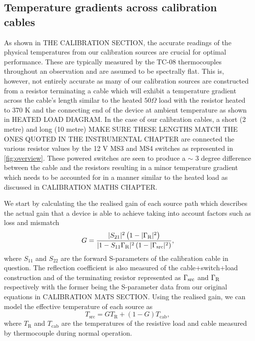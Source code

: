 \subsection{Temperature gradients across calibration cables}\label{sec:cable_gradient}
As shown in THE CALIBRATION SECTION, the accurate readings of the physical temperatures from our calibration sources are crucial for optimal performance. These are typically measured by the TC-08 thermocouples throughout an observation and are assumed to be spectrally flat. This is, however, not entirely accurate as many of our calibration sources are constructed from a resistor terminating a cable which will exhibit a temperature gradient across the cable’s length similar to the heated $50 \Omega$ load with the resistor heated to 370 K and the connecting end of the device at ambient temperature as shown in HEATED LOAD DIAGRAM. In the case of our calibration cables, a short (2 metre) and long (10 metre) MAKE SURE THESE LENGTHS MATCH THE ONES QUOTED IN THE INSTRUMENTAL CHAPTER are connected the various resistor values by the 12 V MS3 and MS4 switches as represented in \cref{fig:overview}. These powered switches are seen to produce a $\sim$ 3 degree difference between the cable and the resistors resulting in a minor temperature gradient which needs to be accounted for in a manner similar to the heated load as discussed in CALIBRATION MATHS CHAPTER.

We start by calculating the the realised gain of each source path which describes the actual gain that a device is able to achieve taking into account factors such as loss and mismatch
\begin{equation}
    G = \frac{ |S_{21}|^2 \left( 1 - |\Gamma_{\mathrm{\mathrm{R}}}|^2 \right) }{ |1 - S_{11} \Gamma_{\mathrm{\mathrm{R}}}|^2 \left( 1 - |\Gamma_{\mathrm{\mathrm{src}}}|^2 \right) },
    \label{eqn:av_gain}
\end{equation}
where $S_{11}$ and $S_{22}$ are the forward S-parameters of the calibration cable in question. The reflection coefficient is also measured of the cable+switch+load construction and of the terminating resistor represented as $\Gamma_{\mathrm{\mathrm{src}}}$ and $\Gamma_{\mathrm{\mathrm{R}}}$ respectively with the former being the S-parameter data from our original equations in CALIBRATION MATS SECTION. Using the realised gain, we can model the effective temperature of each source as
\begin{equation}
    T_{\mathrm{src}} = GT_{\mathrm{R}} + (1 - G)T_{\mathrm{cab}},
    \label{eqn:temp_correction}
\end{equation}
where $T_{\mathrm{R}}$ and $T_{\mathrm{cab}}$ are the temperatures of the resistive load and cable measured by thermocouple during normal operation. 

